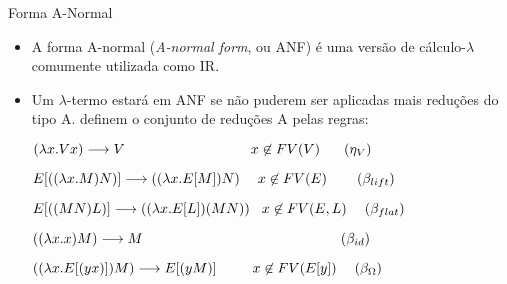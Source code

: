 \begin{frame}{Forma A-Normal}
    \begin{itemize}
        \item A forma A-normal (\textit{A-normal form}, ou ANF) é uma versão de cálculo-$\lambda$ comumente utilizada como IR.

        \item Um $\lambda$-termo estará em ANF se não puderem ser aplicadas mais reduções do tipo A.  definem o conjunto de reduções A pelas regras:
              \begin{flushleft}
                  $(\lambda x.V x) \longrightarrow V  \hspace{21ex} x \not\in FV(V) \hspace{4ex} (\eta_{V})$

                  $E[((\lambda x.M) N)] \longrightarrow ((\lambda x.E[M]) N)  \hspace{3ex} x \not\in FV(E) \hspace{5ex} (\beta_{lift})$

                  $E[((M N) L)] \longrightarrow ((\lambda x.E[L]) (M N))  \hspace{2ex} x \not\in FV(E,L) \hspace{3ex} (\beta_{flat})$

                  $((\lambda x.x) M) \longrightarrow M \hspace{33ex} (\beta_{id})$

                  $((\lambda x.E[(y x)]) M) \longrightarrow E[(y M)] \hspace{6ex} x \not\in FV(E[y]) \hspace{3ex} (\beta_{\Omega})$
              \end{flushleft}
    \end{itemize}
\end{frame}